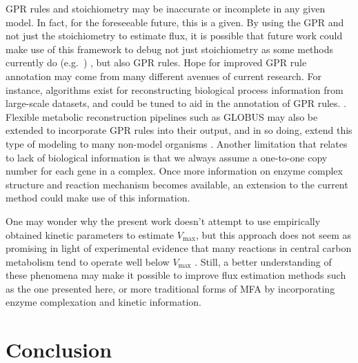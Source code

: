 GPR rules and stoichiometry may be inaccurate or
incomplete in any given model. In fact, for the foreseeable future,
this is a given. By using the GPR and not just the stoichiometry to
estimate flux, it is possible that future work could make use of this
framework to debug not just stoichiometry as some methods currently do
(e.g.\ \citealt{Reed14112006}) , but also GPR rules.  Hope for
improved GPR rule annotation may come from many different avenues of
current research. For instance, algorithms exist for reconstructing
biological process information from large-scale datasets, and could be
tuned to aid in the annotation of GPR rules.
\citep{Mitra2013}. Flexible metabolic reconstruction pipelines such as
GLOBUS may also be extended to incorporate GPR rules into their output, and
in so doing, extend this type of modeling to many non-model organisms
\citep{Plata2012}.  Another limitation that relates to lack of
biological information is that we always assume a one-to-one copy
number for each gene in a complex. Once more information on enzyme
complex structure and reaction mechanism becomes available, an
extension to the current method could make use of this information.

One may wonder why the present work doesn't attempt to use empirically
obtained kinetic parameters to estimate $V_{\max}$, but this approach
does not seem as promising in light of experimental evidence that many
reactions in central carbon metabolism tend to operate well below
$V_{\max}$ \citep{Bennett2009}. Still, a better understanding of these
phenomena may make it possible to improve flux estimation methods such
as the one presented here, or more traditional forms of MFA
\citep{Shestov2013a} by incorporating enzyme complexation and kinetic
information.




%
%


\section{Conclusion}

